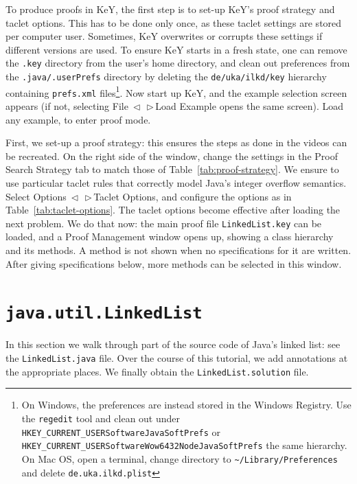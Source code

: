 \documentclass[runningheads]{llncs}
\makeatletter
\theoremstyle{remark}
\DeclareRobustCommand*{\lyxarrow}{%
\@ifstar
{\leavevmode\,$\triangleleft$\,\allowbreak}
{\leavevmode\,$\triangleright$\,\allowbreak}}
\def\bs{\char092}
\makeatother
\begin{document}
To produce proofs in KeY, the first step is to set-up KeY's proof strategy and taclet options. This has to be done only once, as these taclet settings are stored per computer user. Sometimes, KeY overwrites or corrupts these settings if different versions are used. To ensure KeY starts in a fresh state, one can remove the \texttt{.key} directory from the user's home directory, and clean out preferences from the \texttt{.java/.userPrefs} directory by deleting the \texttt{de/uka/ilkd/key} hierarchy containing \texttt{prefs.xml} files\footnote{On Windows, the preferences are instead stored in the Windows Registry. Use the \texttt{regedit} tool and clean out under \texttt{HKEY\_CURRENT\_USER\bs Software\bs JavaSoft\bs Prefs} or \texttt{HKEY\_CURRENT\_USER\bs Software\bs Wow6432Node\bs JavaSoft\bs Prefs} the same hierarchy. On Mac OS, open a terminal, change directory to \texttt{\textasciitilde/Library/Preferences} and delete \texttt{de.uka.ilkd.plist}}. Now start up KeY, and the example selection screen appears (if not, selecting File\lyxarrow Load Example opens the same screen). Load any example, to enter proof mode. 

First, we set-up a proof strategy: this ensures the steps as done in the videos can be recreated. On the right side of the window, change the settings in the Proof Search Strategy tab to match those of Table~\ref{tab:proof-strategy}. We ensure to use particular taclet rules that correctly model Java's integer overflow semantics. Select Options\lyxarrow Taclet Options, and configure the options as in Table~\ref{tab:taclet-options}. The taclet options become effective after loading the next problem. We do that now: the main proof file \texttt{LinkedList.key} can be loaded, and a Proof Management window opens up, showing a class hierarchy and its methods. A method is not shown when no specifications for it are written. After giving specifications below, more methods can be selected in this window.

\section{\texttt{java.util.LinkedList}}\label{sec:linkedlist}

In this section we walk through part of the source code of Java's linked list: see the \texttt{LinkedList.java} file. Over the course of this tutorial, we add annotations at the appropriate places. We finally obtain the \texttt{LinkedList.solution} file.


\end{document}
